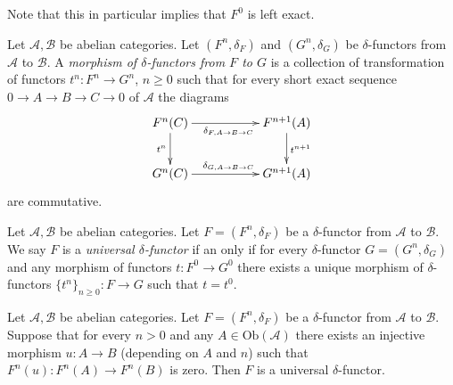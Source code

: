 \noindent
Note that this in particular implies that $F^0$ is left exact.

\begin{definition}
\label{definition-morphism-delta-functors}
Let $\mathcal{A}, \mathcal{B}$ be abelian categories.
Let $(F^n, \delta_F)$ and $(G^n, \delta_G)$ be $\delta$-functors
from $\mathcal{A}$ to $\mathcal{B}$. A {\it morphism of $\delta$-functors
from $F$ to $G$} is a collection of
transformation of functors $t^n : F^n \to G^n$, $n \geq 0$ such
that for every short exact sequence $0 \to A \to B \to C \to 0$
of $\mathcal{A}$ the diagrams
$$
\xymatrix{
F^n(C) \ar[d]_{t^n} \ar[rr]_{\delta_{F, A \to B \to C}} &
& F^{n + 1}(A) \ar[d]^{t^{n + 1}} \\
G^n(C) \ar[rr]^{\delta_{G, A \to B \to C}} & & G^{n + 1}(A)
}
$$
are commutative.
\end{definition}

\begin{definition}
\label{definition-universal-delta-functor}
Let $\mathcal{A}, \mathcal{B}$ be abelian categories.
Let $F = (F^n, \delta_F)$ be a $\delta$-functor
from $\mathcal{A}$ to $\mathcal{B}$.
We say $F$ is a {\it universal $\delta$-functor} if an only
if for every $\delta$-functor $G = (G^n, \delta_G)$ and any
morphism of functors $t : F^0 \to G^0$ there exists
a unique morphism of $\delta$-functors $\{t^n\}_{n \geq 0} : F \to G$
such that $t = t^0$.
\end{definition}

\begin{lemma}
\label{lemma-efface-implies-universal}
Let $\mathcal{A}, \mathcal{B}$ be abelian categories.
Let $F = (F^n, \delta_F)$ be a $\delta$-functor
from $\mathcal{A}$ to $\mathcal{B}$.
Suppose that for every $n > 0$ and any $A \in \text{Ob}(\mathcal{A})$
there exists an injective morphism $u : A \to B$ (depending on $A$ and $n$)
such that $F^n(u) : F^n(A) \to F^n(B)$ is zero. Then $F$ is a universal
$\delta$-functor.
\end{lemma}

